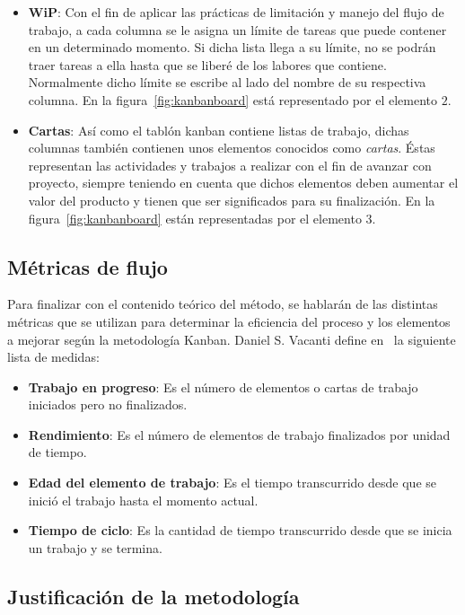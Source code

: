 \begin{itemize}
    \item \textbf{WiP}: Con el fin de aplicar las prácticas de limitación y
    manejo del flujo de trabajo, a cada columna se le asigna un límite de tareas
    que puede contener en un determinado momento. Si dicha lista llega a su
    límite, no se podrán traer tareas a ella hasta que se liberé de los labores
    que contiene. Normalmente dicho límite se escribe al lado del nombre de su
    respectiva columna. En la figura~\ref{fig:kanbanboard} está representado por el
    elemento $2$.

    \item \textbf{Cartas}:
    Así como el tablón kanban contiene listas de trabajo, dichas columnas
    también contienen unos elementos conocidos como \emph{cartas}. Éstas
    representan las actividades y trabajos a realizar con el fin de avanzar con
    proyecto, siempre teniendo en cuenta que dichos elementos deben aumentar el
    valor del producto y tienen que ser significados para su finalización. En la
    figura~\ref{fig:kanbanboard} están representadas por el elemento $3$.
\end{itemize}

\subsection{Métricas de flujo}
Para finalizar con el contenido teórico del método, se hablarán de las distintas
métricas que se utilizan para determinar la eficiencia del proceso y los
elementos a mejorar según la metodología Kanban. Daniel S. Vacanti define
en~\cite{Daniel2022} la siguiente lista de medidas:

\begin{itemize}
    \item \textbf{Trabajo en progreso}: Es el número de elementos o cartas de
    trabajo iniciados pero no finalizados.
    \item \textbf{Rendimiento}: Es el número de elementos de trabajo finalizados
    por unidad de tiempo.
    \item \textbf{Edad del elemento de trabajo}: Es el tiempo transcurrido desde
    que se inició el trabajo hasta el momento actual.
    \item \textbf{Tiempo de ciclo}: Es la cantidad de tiempo transcurrido desde
    que se inicia un trabajo y se termina.
\end{itemize}

\subsection{Justificación de la metodología}

